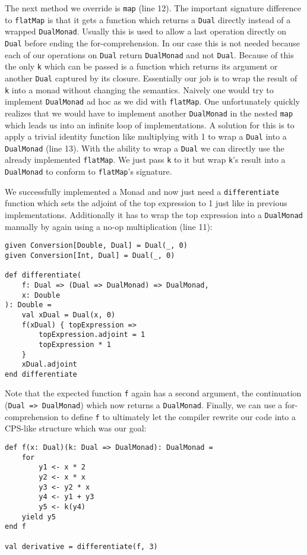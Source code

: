 The next method we override is \lstinline{map} (line 12). The important signature difference to \lstinline{flatMap} is that it gets a function which returns a \lstinline{Dual} directly instead of a wrapped \lstinline{DualMonad}. Usually this is used to allow a last operation directly on \lstinline{Dual} before ending the for-comprehension. In our case this is not needed because each of our operations on \lstinline{Dual} return \lstinline{DualMonad} and not \lstinline{Dual}. Because of this the only \lstinline{k} which can be passed is a function which returns its argument or another \lstinline{Dual} captured by its closure. Essentially our job is to wrap the result of \lstinline{k} into a monad without changing the semantics. Naively one would try to implement \lstinline{DualMonad} ad hoc as we did with \lstinline{flatMap}. One unfortunately quickly realizes that we would have to implement another \lstinline{DualMonad} in the nested \lstinline{map} which leads us into an infinite loop of implementations. A solution for this is to apply a trivial identity function like multiplying with 1 to wrap a \lstinline{Dual} into a \lstinline{DualMonad} (line 13). With the ability to wrap a \lstinline{Dual} we can directly use the already implemented \lstinline{flatMap}. We just pass \lstinline{k} to it but wrap \lstinline{k}'s result into a \lstinline{DualMonad} to conform to \lstinline{flatMap}'s signature.

We successfully implemented a Monad and now just need a \lstinline{differentiate} function which sets the adjoint of the top expression to 1 just like in previous implementations. Additionally it has to wrap the top expression into a \lstinline{DualMonad} manually by again using a no-op multiplication (line 11):
\begin{lstlisting}
given Conversion[Double, Dual] = Dual(_, 0)
given Conversion[Int, Dual] = Dual(_, 0)

def differentiate(
    f: Dual => (Dual => DualMonad) => DualMonad, 
    x: Double
): Double =
    val xDual = Dual(x, 0)
    f(xDual) { topExpression =>
        topExpression.adjoint = 1
        topExpression * 1
    }
    xDual.adjoint
end differentiate
\end{lstlisting}
Note that the expected function \lstinline{f} again has a second argument, the continuation (\lstinline{Dual => DualMonad}) which now returns a \lstinline{DualMonad}.
Finally, we can use a for-comprehension to define \lstinline{f} to ultimately let the compiler rewrite our code into a CPS-like structure which was our goal:
\begin{lstlisting}
def f(x: Dual)(k: Dual => DualMonad): DualMonad =
    for
        y1 <- x * 2
        y2 <- x * x
        y3 <- y2 * x
        y4 <- y1 + y3
        y5 <- k(y4)
    yield y5
end f

val derivative = differentiate(f, 3)
\end{lstlisting}



